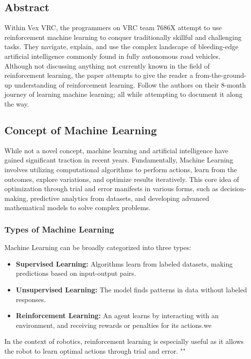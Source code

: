 \label{Artificial-Intelligence-Library}
\subsection*{Abstract}

Within Vex VRC, the programmers on VRC team 7686X attempt to use reinforcement machine learning to conquer traditionally skillful and challenging tasks. They navigate, explain, and use the complex landscape of bleeding-edge artificial intelligence commonly found in fully autonomous road vehicles. Although not discussing anything not currently known in the field of reinforcement learning, the paper attempts to give the reader a from-the-ground-up understanding of reinforcement learning. Follow the authors on their 8-month journey of learning machine learning; all while attempting to document it along the way.

\subsection*{Concept of Machine Learning}

While not a novel concept, machine learning and artificial intelligence have gained significant traction in recent years. Fundamentally, Machine Learning involves utilizing computational algorithms to perform actions, learn from the outcomes, explore variations, and optimize results iteratively. This core idea of optimization through trial and error manifests in various forms, such as decision-making, predictive analytics from datasets, and developing advanced mathematical models to solve complex problems.

\subsubsection*{Types of Machine Learning}
Machine Learning can be broadly categorized into three types:
\begin{itemize}
    \item \textbf{Supervised Learning:} Algorithms learn from labeled datasets, making predictions based on input-output pairs.
    \item \textbf{Unsupervised Learning:} The model finds patterns in data without labeled responses.
    \item \textbf{Reinforcement Learning:} An agent learns by interacting with an environment, and receiving rewards or penalties for its actions.we
\end{itemize}
In the context of robotics, reinforcement learning is especially useful as it allows the robot to learn optimal actions through trial and error. "\cite{lex_friedman}"

